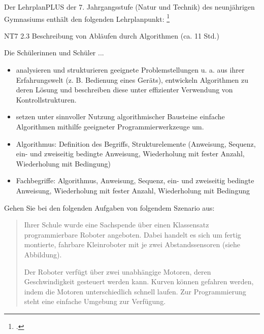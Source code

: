 \documentclass{lehramt-informatik-aufgabe}
\begin{document}

Der LehrplanPLUS der 7. Jahrgangsstufe (Natur und Technik) des
neunjährigen Gymnasiums enthält den folgenden Lehrplanpunkt:
\footcite{examen:66118:2021:03}

\begin{liKasten}
NT7 2.3 Beschreibung von Abläufen durch Algorithmen (ca. 11 Std.)


Die Schülerinnen und Schüler ...

\begin{itemize}
\item analysieren und strukturieren geeignete Problemstellungen u. a.
aus ihrer Erfahrungswelt (z. B. Bedienung eines Geräts), entwickeln
Algorithmen zu deren Lösung und beschreiben diese unter effizienter
Verwendung von Kontrollstrukturen.

\item setzen unter sinnvoller Nutzung algorithmischer Bausteine einfache
Algorithmen mithilfe geeigneter Programmierwerkzeuge um.
\end{itemize}


\begin{itemize}
\item Algorithmus: Definition des Begriffs, Strukturelemente (Anweisung,
Sequenz, ein- und zweiseitig bedingte Anweisung, Wiederholung mit fester
Anzahl, Wiederholung mit Bedingung)

\item Fachbegriffe: Algorithmus, Anweisung, Sequenz, ein- und zweiseitig
bedingte Anweisung, Wiederholung mit fester Anzahl, Wiederholung mit
Bedingung
\end{itemize}
\end{liKasten}


\noindent
Gehen Sie bei den folgenden Aufgaben von folgendem Szenario aus:

\begin{quote}
Ihrer Schule wurde eine Sachspende über einen Klassensatz
programmierbare Roboter angeboten. Dabei handelt es sich um fertig
montierte, fahrbare Kleinroboter mit je zwei Abstandssensoren (siehe
Abbildung).

Der Roboter verfügt über zwei unabhängige Motoren, deren Geschwindigkeit
gesteuert werden kann. Kurven können gefahren werden, indem die Motoren
unterschiedlich schnell laufen. Zur Programmierung steht eine einfache
Umgebung zur Verfügung.
\end{quote}
\end{document}
